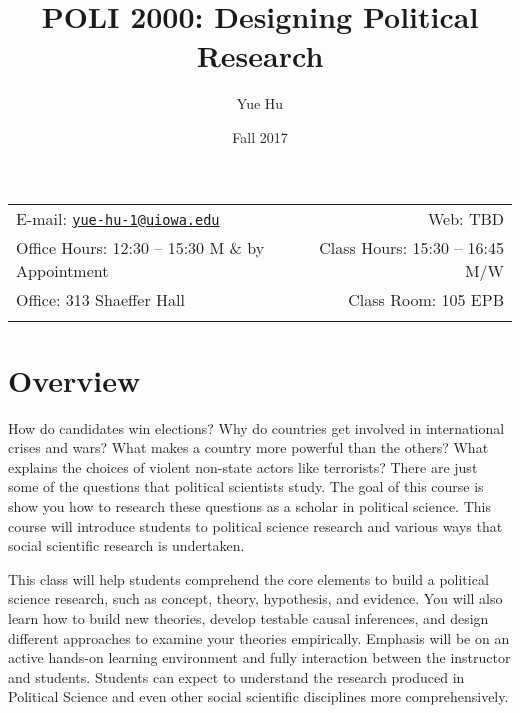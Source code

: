 \documentclass[11pt,]{article}
\title{POLI 2000: Designing Political Research}
\author{Yue Hu}
\date{Fall 2017}
\theoremstyle{definition}
\theoremstyle{definition}
\theoremstyle{remark}
\begin{document}
  

		\maketitle
		
	
		\thispagestyle{firststyle}



	\noindent \begin{tabular*}{\textwidth}{ @{\extracolsep{\fill}} lr @{\extracolsep{\fill}}}


E-mail: \texttt{\href{mailto:yue-hu-1@uiowa.edu}{\nolinkurl{yue-hu-1@uiowa.edu}}} & Web: TBD\\
Office Hours: 12:30 -- 15:30 M \& by Appointment  &  Class Hours: 15:30 -- 16:45 M/W\\
Office: 313 Shaeffer Hall  & Class Room: 105 EPB\\
	&  \\
	\hline
	\end{tabular*}
	
\vspace{2mm}
	


\section{Overview}\label{overview}

How do candidates win elections? Why do countries get involved in
international crises and wars? What makes a country more powerful than
the others? What explains the choices of violent non-state actors like
terrorists? There are just some of the questions that political
scientists study. The goal of this course is show you how to research
these questions as a scholar in political science. This course will
introduce students to political science research and various ways that
social scientific research is undertaken.

This class will help students comprehend the core elements to build a
political science research, such as concept, theory, hypothesis, and
evidence. You will also learn how to build new theories, develop
testable causal inferences, and design different approaches to examine
your theories empirically. Emphasis will be on an active hands-on
learning environment and fully interaction between the instructor and
students. Students can expect to understand the research produced in
Political Science and even other social scientific disciplines more
comprehensively.
\end{document}
